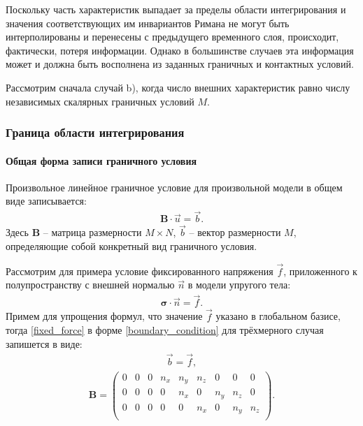 Поскольку часть характеристик выпадает за пределы области интегрирования 
и значения соответствующих им инвариантов Римана не могут быть интерполированы
и перенесены с предыдущего временного слоя, происходит, фактически, потеря информации. 
Однако в большинстве случаев эта информация может и должна быть восполнена
из заданных граничных и контактных условий.

Рассмотрим сначала случай b), когда число внешних характеристик 
равно числу независимых скалярных граничных условий $M$.


\subsubsection{Граница области интегрирования}
\paragraph{Общая форма записи граничного условия}
Произвольное линейное граничное условие для произвольной модели 
в общем виде записывается:
\begin{eqnarray}
\label{boundary_condition}
	\mathbf{B} \cdot \vec{u} = \vec{b}.
\end{eqnarray}
Здесь $\mathbf{B}$ -- матрица размерности $M \times N$, $\vec{b}$ -- вектор размерности $M$, 
определяющие собой конкретный вид граничного условия.

Рассмотрим для примера условие фиксированного напряжения $\vec{f}$, 
приложенного к полупространству с внешней нормалью $\vec{n}$ в модели упругого тела:
\begin{eqnarray}
\label{fixed_force}
	\mathbf{\sigma} \cdot \vec{n} = \vec{f}.
\end{eqnarray}
Примем для упрощения формул, что значение $\vec{f}$ указано в глобальном базисе,
тогда \eqref{fixed_force} в форме \eqref{boundary_condition} 
для трёхмерного случая запишется в виде: 
\begin{eqnarray}
	\vec{b} = \vec{f},
\end{eqnarray}
\begin{align}
\label{fixed_force_global_basis_3D}
	\mathbf{B} =
	\left( \begin{array}{cccccccccccc}
	 0 & 0 & 0 & n_x & n_y & n_z & 0 & 0 & 0 \\
	 0 & 0 & 0 & 0 & n_x & 0 & n_y & n_z & 0 \\
	 0 & 0 & 0 & 0 & 0 & n_x & 0 & n_y & n_z \\
	\end{array} \right).
\end{align}

